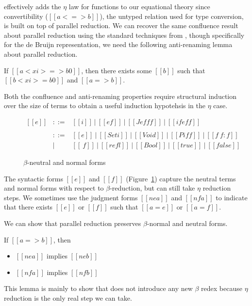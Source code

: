 \documentclass[acmsmall,screen=true,
\ifpublic review=false\else,review=true\fi
  ,anonymous=\ifanonymous true\else false\fi]{acmart}
\begin{document}
 effectively adds the $\eta$ law for functions to our
equational theory since convertibility ($[[a <=> b]]$), the untyped relation used for type
conversion, is built on top of parallel reduction. We can recover the
same confluence result about parallel reduction using the standard
techniques from \citet{barendregt:lambda-calculi-with-types,
takahashi-parallel-reduction}, though specifically for the de Bruijn
representation, we need the following anti-renaming lemma about
parallel reduction.
\begin{lemma}
  \label{lemma:parantirenaming} If $[[a < xi > => b0]]$, then there
exists some $[[b]]$ such that $[[b < xi > = b0]]$ and $[[a => b]]$.
\end{lemma}
Both the confluence and anti-renaming properties require structural
induction over the size of terms to obtain a useful induction
hypotehsis in the $\eta$ case.

\begin{figure}[h]
  \[
    \begin{array}{lcl}
      [[e]] & ::= & [[i]]\ |\ [[e f]]\ |\ [[J e f f f]]\ |\ [[if e f
                    f]] \\ \\
      [[f]] & ::= & [[e]]\ |\ [[Set i]]\ |\ [[Void]]\ |\ [[Pi f f]]\
                    |\ [[f ~ f : f]]\\
            & |   & [[\ f]]\ |\ [[refl]]\ |\ [[Bool]]\ |\ [[true]]\ |\ [[false]]
    \end{array}
  \]
  \caption{$\beta$-neutral and normal forms}
  \label{fig:nenf}
\end{figure}


The syntactic forms $[[e]]$ and $[[f]]$ (Figure~\ref{fig:nenf}) capture the neutral terms
and normal forms with respect to $\beta$-reduction, but can still take
$\eta$ reduction steps. We sometimes use the judgment forms $[[ne a]]$
and $[[nf a]]$ to indicate that there exists $[[e]]$ or $[[f]]$ such
that $[[a = e]]$ or $[[a = f]]$.

We can show that parallel reduction preserves $\beta$-normal and
neutral forms.
\begin{lemma}
  \label{lemma:parnenf}
  If $[[a => b]]$, then
  \begin{itemize}
  \item $[[ne a]]$ implies $[[ne b]]$
  \item $[[nf a]]$ implies $[[nf b]]$
  \end{itemize}
\end{lemma}
This lemma is mainly to show that  does not introduce
any new $\beta$ redex because $\eta$ reduction is the only real step
we can take.
\end{document}
